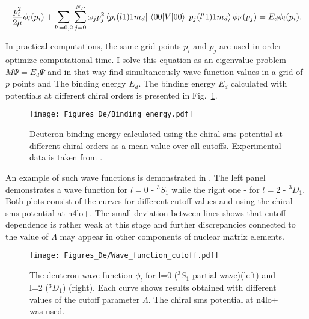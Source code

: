     
    \begin{equation}
        \frac{p_i^2}{2\mu} \phi_l(p_i) +
        \sum_{l^\prime =0,2}\sum_{j =0}^{N_P}  \omega_j p^{2}_j 
        \bra{p_i(l1)1m_d} \matrixel{00}{V}{00} \ket{p_j(l^\prime1)1m_d}
        \phi_{l^\prime}(p_j) = 
        E_d \phi_l(p_i).
        \label{integral2}
    \end{equation}

    In practical computations, the same grid points $p_i$ and $p_j$ are used in order
    optimize computational time. 
    I solve this equation as an eigenvalue problem $M\Psi = E_d \Psi$ and
    in that way
    find simultaneously wave function values in a grid of $p$ points and The binding energy $E_d$. 
    The binding energy $E_d$ calculated with potentials at different chiral orders 
    is presented in Fig.~\ref{bind}.

    \begin{figure}[h]
        \begin{center}
            \texttt{[image: Figures\_De/Binding\_energy.pdf]}
        \end{center}
        \caption{Deuteron binding energy calculated using the chiral \gls{sms} potential
        at different chiral orders as a mean value over all cutoffs.
        Experimental data is taken from \cite{VANDERLEUN1982261}.}
        \label{bind}
    \end{figure}

    An example of such wave functions is demonstrated in . The left panel demonstrates
    a wave function for $l=0$ - $^3S_1$ while the right one - for $l=2$ - $^3D_1$. Both 
    plots consist of the curves for different cutoff values and using the chiral \gls{sms} potential at \gls{n4lo+}.
    The small deviation between lines shows that cutoff dependence is rather weak at this stage
    and further discrepancies connected to the value of $\Lambda$ may appear in other components
    of nuclear matrix elements.  

    \begin{figure}[h]
        \begin{center}
            \texttt{[image: Figures\_De/Wave\_function\_cutoff.pdf]}
        \end{center}
        \caption{The deuteron wave function $\phi_l$ for l=0 ($^3S_1$ partial wave)(left) and l=2 ($^3D_1$) (right).
        Each curve shows results obtained with different values of the cutoff parameter $\Lambda$. 
        The chiral \gls{sms} potential at \gls{n4lo+} was used.}
        \label{wave_func}
    \end{figure}

